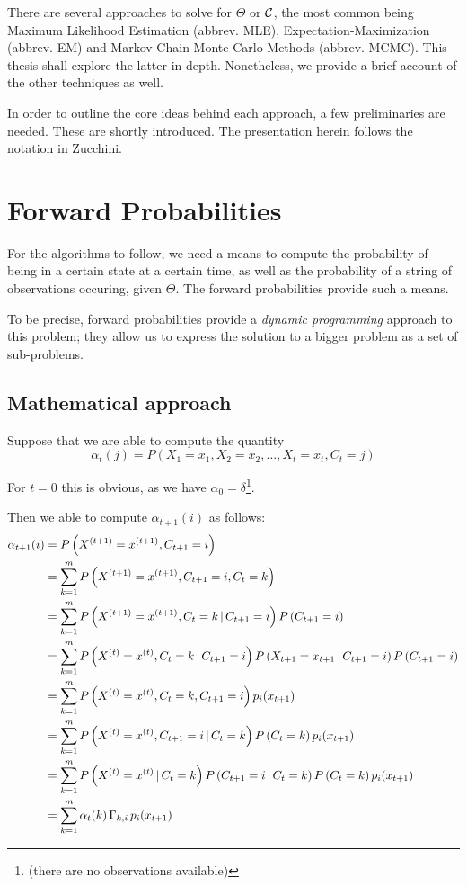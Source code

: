 There are several approaches to solve for $\Theta$ or $\mathcal{C}$, the most common being Maximum Likelihood Estimation (abbrev. MLE), Expectation-Maximization (abbrev. EM) and Markov Chain Monte Carlo Methods (abbrev. MCMC). This thesis shall explore the latter in depth. Nonetheless, we provide a brief account of the other techniques as well.

In order to outline the core ideas behind each approach, a few preliminaries are needed. These are shortly introduced. The presentation herein follows the notation in Zucchini.


\section{Forward Probabilities}
For the algorithms to follow, we need a means to compute the probability of being in a certain state at a certain time, as well as the probability of a string of observations occuring, given $\Theta$. The forward probabilities provide such a means. 

To be precise, forward probabilities provide a \textit{dynamic programming} approach to this problem; they allow us to express the solution to a bigger problem as a set of sub-problems. 


\subsection{Mathematical approach}
Suppose that we are able to compute the quantity 
\[
	\alpha_t(j) = P\left(X_1 = x_1, X_2 = x_2, \dots, X_t = x_t, C_t = j\right)
\]

For $t=0$ this is obvious, as we have $\alpha_0 = \delta$\footnote{(there are no observations available)}. 

Then we able to compute $\alpha_{t+1}(i)$ as follows:
\begin{align*}
	\alpha_{t+1}(i) 
	&=  P\left(X^{(t+1)} = x^{(t+1)},  C_{t+1} = i\right) \\
	 &=  \sum_{k=1}^m P\left(X^{(t+1)} = x^{(t+1)}, C_{t+1} = i, C_t = k\right) \\ 
	 &= \sum_{k=1}^m P\left(X^{(t+1)} = x^{(t+1)}, C_t = k \, | \,  C_{t+1} = i\right) P \left( C_{t+1} = i \right) \\
	 &= \sum_{k=1}^m P\left(X^{(t)} = x^{(t)}, C_t = k \, | \,  C_{t+1} = i\right) P\left(X_{t+1} = x_{t+1} \, | \,  C_{t+1} = i\right) P \left( C_{t+1} = i \right) \\
	 &= \sum_{k=1}^m P \left( X^{(t)} = x^{(t)}, C_t = k, C_{t+1} = i  \right) p_i(x_{t+1}) \\
	 &= \sum_{k=1}^m P\left(
	 	X^{(t)} = x^{(t)}, C_{t+1} = i \, | \, C_t = k\right) P\left( C_t = k\right) p_i(x_{t+1})\\
 	&= \sum_{k=1}^m P\left(
 		X^{(t)} = x^{(t)} \, | \, C_t = k\right) P\left( C_{t+1} = i \, | \, C_t = k\right) P\left( C_t = k\right) p_i(x_{t+1})\\
 	&=  \sum_{k=1}^m \alpha_t(k)  \, \Gamma_{k, i} \, p_i(x_{t+1}) \\
\end{align*}

